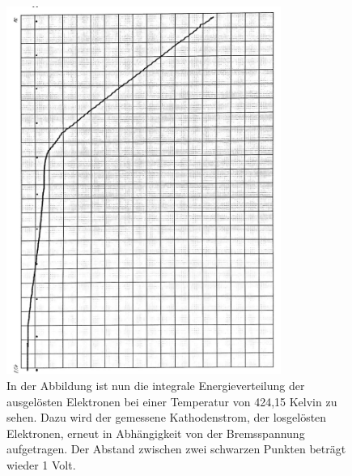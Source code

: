 \documentclass[titlepage = firstcover]{scrartcl}
\begin{document}
                \begin{figure}[h]
                    \centering
                    \includegraphics[width = 0.8\textwidth, angle=90]{T424.pdf}
                    \caption{In der Abbildung ist nun die integrale Energieverteilung der ausgelösten Elektronen bei einer Temperatur von 424,15 Kelvin zu sehen. Dazu wird der gemessene Kathodenstrom, der losgelösten Elektronen, erneut in Abhängigkeit von der Bremsspannung aufgetragen. Der Abstand zwischen zwei schwarzen Punkten beträgt wieder 1 Volt.}
                    \label{fig:Bild424}
                \end{figure}

            \FloatBarrier

            \noindent            
\end{document}
